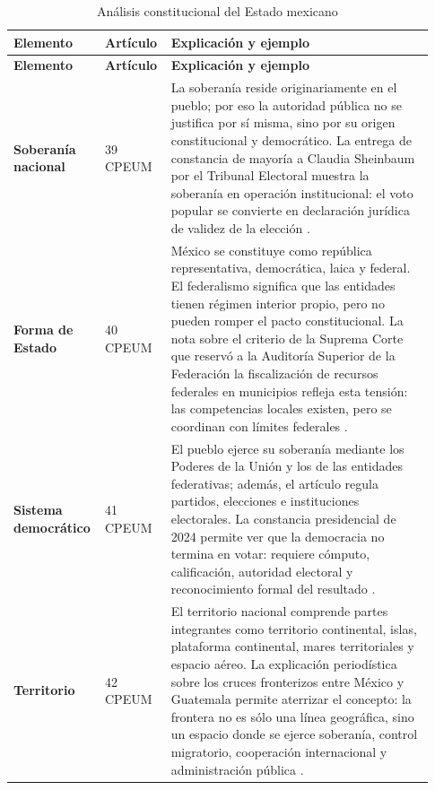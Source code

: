 \documentclass[
	spanish,
	letterpaper, oneside
]{article}
\begin{document}
\begingroup
\small
\setlength{\tabcolsep}{4pt}
\renewcommand{\arraystretch}{1.35}
\begin{longtable}{@{}p{0.19\linewidth}p{0.13\linewidth}p{0.61\linewidth}@{}}
\caption{Análisis constitucional del Estado mexicano}\label{tab:analisis-caso-estado}\\
\toprule
\textbf{Elemento} & \textbf{Artículo} & \textbf{Explicación y ejemplo} \\
\midrule
\endfirsthead
\toprule
\textbf{Elemento} & \textbf{Artículo} & \textbf{Explicación y ejemplo} \\
\midrule
\endhead
\bottomrule
\endlastfoot

\textbf{Soberanía nacional} &
39 CPEUM &
La soberanía reside originariamente en el pueblo; por eso la autoridad pública no se justifica por sí misma, sino por su origen constitucional y democrático. La entrega de constancia de mayoría a Claudia Sheinbaum por el Tribunal Electoral muestra la soberanía en operación institucional: el voto popular se convierte en declaración jurídica de validez de la elección \citep{jornadaSheinbaum2024}. \\
\midrule

\textbf{Forma de Estado} &
40 CPEUM &
México se constituye como república representativa, democrática, laica y federal. El federalismo significa que las entidades tienen régimen interior propio, pero no pueden romper el pacto constitucional. La nota sobre el criterio de la Suprema Corte que reservó a la Auditoría Superior de la Federación la fiscalización de recursos federales en municipios refleja esta tensión: las competencias locales existen, pero se coordinan con límites federales \citep{infobaeAuditorias2026}. \\
\midrule

\textbf{Sistema democrático} &
41 CPEUM &
El pueblo ejerce su soberanía mediante los Poderes de la Unión y los de las entidades federativas; además, el artículo regula partidos, elecciones e instituciones electorales. La constancia presidencial de 2024 permite ver que la democracia no termina en votar: requiere cómputo, calificación, autoridad electoral y reconocimiento formal del resultado \citep{jornadaSheinbaum2024}. \\
\midrule

\textbf{Territorio} &
42 CPEUM &
El territorio nacional comprende partes integrantes como territorio continental, islas, plataforma continental, mares territoriales y espacio aéreo. La explicación periodística sobre los cruces fronterizos entre México y Guatemala permite aterrizar el concepto: la frontera no es sólo una línea geográfica, sino un espacio donde se ejerce soberanía, control migratorio, cooperación internacional y administración pública \citep{trejoCrucesFronterizos2024}. \\
\midrule


\end{longtable}
\end{document}
